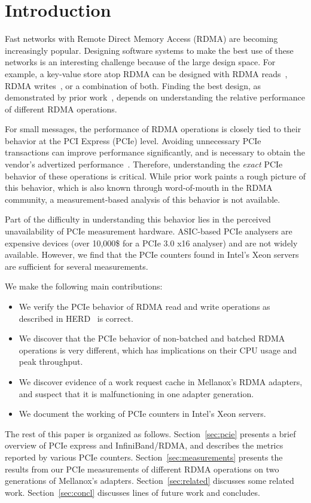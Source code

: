 \section{Introduction}
\label{sec:intro}

Fast networks with Remote Direct Memory Access (RDMA) are becoming increasingly
popular.  Designing software systems to make the best use of these networks
is an interesting challenge because of the large design space. For example,
a key-value store atop RDMA can be designed with RDMA reads~\cite{Pilaf, FaRM},
RDMA writes~\cite{Kalia:sigcomm2014}, or a combination of both. Finding the
best design, as demonstrated by prior work~\cite{Kalia:sigcomm2014}, depends on
understanding the relative performance of different RDMA operations.

For small messages, the performance of RDMA operations is closely tied to their
behavior at the PCI Express (PCIe) level. Avoiding unnecessary PCIe transactions
can improve performance significantly, and is necessary to obtain the vendor's
advertized performance~\cite{Kalia:sigcomm2014}. Therefore, understanding the
\emph{exact} PCIe behavior of these operations is critical. While prior work
paints a rough picture of this behavior, which is also known through
word-of-mouth in the RDMA community, a measurement-based analysis of this
behavior is not available.

Part of the difficulty in understanding this behavior lies in the perceived
unavailability of PCIe measurement hardware. ASIC-based PCIe analysers are
expensive devices (over 10,000\$ for a PCIe 3.0 x16 analyser) and are not
widely available. However, we find that the PCIe counters found in Intel's
Xeon servers are sufficient for several measurements.


We make the following main contributions:
\begin{itemize}
\item We verify the PCIe behavior of RDMA read and write operations as
described in HERD~\cite{Kalia:sigcomm2014} is correct.
\item We discover that the PCIe behavior of non-batched and batched RDMA
operations is very different, which has implications on their CPU usage and
peak throughput.
\item We discover evidence of a work request cache in Mellanox's RDMA adapters,
and suspect that it is malfunctioning in one adapter generation.
\item We document the working of PCIe counters in Intel's Xeon servers.
\end{itemize}

The rest of this paper is organized as follows. Section~\ref{sec:pcie} presents
a brief overview of PCIe express and InfiniBand/RDMA, and describes the
metrics reported by various PCIe counters. Section~\ref{sec:measurements}
presents the results from our PCIe measurements of different RDMA operations
on two generations of Mellanox's adapters. Section~\ref{sec:related} discusses
some related work. Section~\ref{sec:concl} discusses lines of future work and
concludes.
